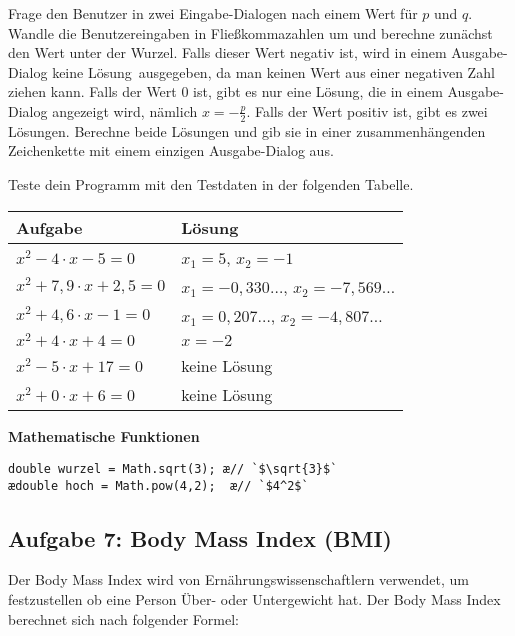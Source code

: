 Frage den Benutzer in zwei Eingabe-Dialogen nach einem Wert für $p$ und $q$.
Wandle die Benutzereingaben in Fließkommazahlen um und berechne zunächst den
Wert unter der Wurzel. Falls dieser Wert negativ ist, wird in einem
Ausgabe-Dialog \glqq keine Lösung\grqq\ ausgegeben, da man keinen Wert aus
einer negativen Zahl ziehen kann. Falls der Wert 0 ist, gibt es nur eine Lösung,
die in einem Ausgabe-Dialog angezeigt wird, nämlich $x = - \frac{p}{2}$. Falls
der Wert positiv ist, gibt es zwei Lösungen. Berechne beide Lösungen und gib
sie in einer zusammenhängenden Zeichenkette mit einem einzigen Ausgabe-Dialog
aus.

Teste dein Programm mit den Testdaten in der folgenden Tabelle.

\begin{minipage}{0.58\textwidth}
\begin{tabular}{|l|l|}\hline
\textbf{Aufgabe} & \textbf{Lösung}
\\ \hline
$x^2 - 4 \cdot x - 5 = 0$ & $x_1 = 5$, $x_2 = -1$
\\ 
$x^2 + 7,9 \cdot x + 2,5 = 0$ & $x_1 = -0,330\ldots$, $x_2 = -7,569\ldots$
\\ 
$x^2 + 4,6 \cdot x - 1 = 0$ & $x_1 = 0,207\ldots$, $x_2 = -4,807\ldots$
\\ 
$x^2 + 4 \cdot x + 4 = 0$ & $x = -2$
\\ 
$x^2 - 5 \cdot x + 17 = 0$ & keine Lösung
\\ 
$x^2 + 0 \cdot x + 6 = 0$ & keine Lösung
\\ \hline
\end{tabular}
\end{minipage}\hfill
\begin{minipage}{0.42\textwidth}
\textbf{Mathematische Funktionen}

\begin{lstlisting}
double wurzel = Math.sqrt(3); æ// `$\sqrt{3}$`
ædouble hoch = Math.pow(4,2);  æ// `$4^2$`
\end{lstlisting}
\end{minipage}


\subsection{Aufgabe 7: Body Mass Index (BMI)}

Der Body Mass Index wird von
Ernährungswissenschaftlern verwendet, um festzustellen
ob eine Person Über- oder Untergewicht hat. Der Body
Mass Index berechnet sich nach folgender Formel:

